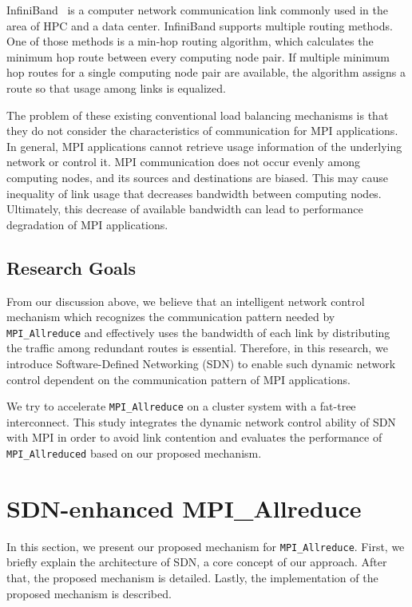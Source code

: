 InfiniBand~\cite{infiniband} is a computer network communication link
commonly used in the area of HPC and a data center. InfiniBand supports
multiple routing methods. One of those methods is a min-hop routing
algorithm, which calculates the minimum hop route between every
computing node pair. If multiple minimum hop routes for a single
computing node pair are available, the algorithm assigns a route so that
usage among links is equalized.

The problem of these existing conventional load balancing mechanisms is
that they do not consider the characteristics of communication for MPI
applications. In general, MPI applications cannot retrieve usage
information of the underlying network or control it. MPI communication
does not occur evenly among computing nodes, and its sources and
destinations are biased. This may cause inequality of link usage that
decreases bandwidth between computing nodes. Ultimately, this decrease
of available bandwidth can lead to performance degradation of MPI
applications.

\hypertarget{research-goals}{%
\subsection{Research Goals}\label{research-goals}}

From our discussion above, we believe that an intelligent network
control mechanism which recognizes the communication pattern needed by
\texttt{MPI\_Allreduce} and effectively uses the bandwidth of each link
by distributing the traffic among redundant routes is essential.
Therefore, in this research, we introduce Software-Defined Networking
(SDN) to enable such dynamic network control dependent on the
communication pattern of MPI applications.

We try to accelerate \texttt{MPI\_Allreduce} on a cluster system with a
fat-tree interconnect. This study integrates the dynamic network control
ability of SDN with MPI in order to avoid link contention and evaluates
the performance of \texttt{MPI\_Allreduced} based on our proposed
mechanism.

\hypertarget{sdn-enhanced-mpi_allreduce}{%
\section{SDN-enhanced MPI\_Allreduce}\label{sdn-enhanced-mpi_allreduce}}

In this section, we present our proposed mechanism for
\texttt{MPI\_Allreduce}. First, we briefly explain the architecture of
SDN, a core concept of our approach. After that, the proposed mechanism
is detailed. Lastly, the implementation of the proposed mechanism is
described.

